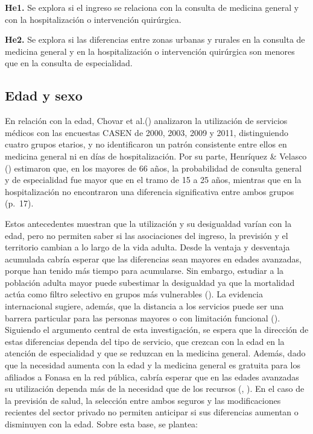 \documentclass[
  spanish,
  a4paper,
  oneside]{scrbook}
\begin{document}
\textbf{He1.} Se explora si el ingreso se relaciona con la consulta de
medicina general y con la hospitalización o intervención quirúrgica.

\textbf{He2.} Se explora si las diferencias entre zonas urbanas y
rurales en la consulta de medicina general y en la hospitalización o
intervención quirúrgica son menores que en la consulta de especialidad.

\subsection{Edad y sexo}\label{edad-y-sexo}

En relación con la edad, Chovar et
al.() analizaron la
utilización de servicios médicos con las encuestas CASEN de 2000, 2003,
2009 y 2011, distinguiendo cuatro grupos etarios, y no identificaron un
patrón consistente entre ellos en medicina general ni en días de
hospitalización. Por su parte, Henríquez \& Velasco
() estimaron que, en
los mayores de 66 años, la probabilidad de consulta general y de
especialidad fue mayor que en el tramo de 15 a 25 años, mientras que en
la hospitalización no encontraron una diferencia significativa entre
ambos grupos (p.~17).

Estos antecedentes muestran que la utilización y su desigualdad varían
con la edad, pero no permiten saber si las asociaciones del ingreso, la
previsión y el territorio cambian a lo largo de la vida adulta. Desde la
ventaja y desventaja acumulada cabría esperar que las diferencias sean
mayores en edades avanzadas, porque han tenido más tiempo para
acumularse. Sin embargo, estudiar a la población adulta mayor puede
subestimar la desigualdad ya que la mortalidad actúa como filtro
selectivo en grupos más vulnerables
(). La
evidencia internacional sugiere, además, que la distancia a los
servicios puede ser una barrera particular para las personas mayores o
con limitación funcional
(). Siguiendo el argumento central de esta investigación, se espera
que la dirección de estas diferencias dependa del tipo de servicio, que
crezcan con la edad en la atención de especialidad y que se reduzcan en
la medicina general. Además, dado que la necesidad aumenta con la edad y
la medicina general es gratuita para los afiliados a Fonasa en la red
pública, cabría esperar que en las edades avanzadas su utilización
dependa más de la necesidad que de los recursos
(,
). En el caso de la previsión
de salud, la selección entre ambos seguros y las modificaciones
recientes del sector privado no permiten anticipar si sus diferencias
aumentan o disminuyen con la edad. Sobre esta base, se plantea:
\end{document}

